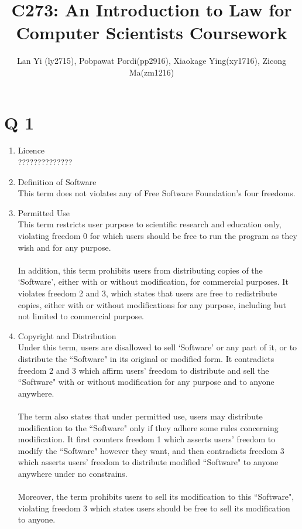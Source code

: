 \documentclass[a4paper]{article}
\title{C273: An Introduction to Law for Computer Scientists Coursework}
\author{Lan Yi (ly2715), Pobpawat Pordi(pp2916), Xiaokage Ying(xy1716), Zicong Ma(zm1216)}
\begin{document}
\maketitle
\section*{Q 1}
\begin{enumerate}
\item Licence
\\??????????????
\item Definition of Software
\\ This term does not violates any of Free Software Foundation's four freedoms.
\item Permitted Use
\\This term restricts user purpose to scientific research and education only, violating freedom 0 for which users should be free to run the program as they wish and for any purpose.
\\
\\In addition, this term prohibits users from distributing copies of the `Software', either with or without modification, for commercial purposes. It violates freedom 2 and 3, which states that users are free to redistribute copies, either with or without modifications for any purpose, including but not limited to commercial purpose. 

\item Copyright and Distribution
\\Under this term, users are disallowed to sell `Software' or any part of it, or to distribute the ``Software" in its original or modified form. It contradicts freedom 2 and 3 which affirm users' freedom to distribute and sell the ``Software" with or without modification for any purpose and to anyone anywhere. 
\\
\\ The term also states that under permitted use, users may distribute modification to the ``Software" only if they adhere some rules concerning modification. It first counters freedom 1 which asserts users' freedom to modify the ``Software" however they want, and then contradicts freedom 3 which asserts users' freedom to distribute modified ``Software" to anyone anywhere under no constrains. 
\\ 
\\ Moreover, the term prohibits users to sell its modification to this ``Software", violating freedom 3 which states users should be free to sell its modification to anyone. 


\end{enumerate}
\end{document}
